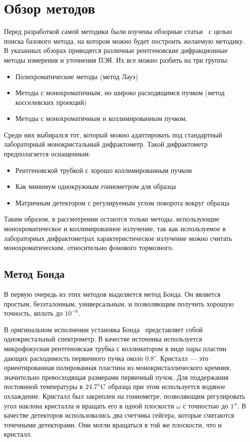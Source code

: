 \section{Обзор методов}

Перед разработкой самой методики были изучены обзорные статьи~\cite{Lider:2020,Galdecka:2006} с целью поиска базового метода, на котором можно будет построить желаемую методику.
В указанных обзорах приводятся различные рентгеновские дифракционные методы измерения и уточнения ПЭЯ.
Их все можно разбить на три группы:
\begin{itemize}
    \item Полихроматические методы (метод Лауэ)
    \item Методы с монохроматичным, но широко расходящимся пучком (метод косселевских проекций)
    \item Методы с монохроматичным и коллимированным пучком.
\end{itemize}
Среди них выбирался тот, который можно адаптировать под стандартный лабораторный монокристальный дифрактометр.
Такой дифрактометр предполагается оснащенным:
\begin{itemize}
    \item Рентгеновской трубкой с хорошо коллимированным пучком
    \item Как минимум однокружным гониометром для образца
    \item Матричным детектором с регулируемым углом поворота вокруг образца
\end{itemize}
Таким образом, в рассмотрении остаются только методы, использующие монохроматическое и коллимированное излучение, так как используемое в лабораторных дифрактометрах характеристическое излучение можно считать монохроматическим, относительно фонового тормозного.

\subsection{Метод Бонда}

В первую очередь из этих методов выделяется метод Бонда.
Он является простым, безэталонным, универсальным, и позволяющим получить хорошую точность, вплоть до $10^{-6}$.

В оригинальном исполнении установка Бонда~\cite{Bond:1960} представляет собой однокристальный спектрометр.
В качестве источника используется микрофокусная рентгеновская трубка с коллиматором в виде пары пластин дающих расходимость первичного пучка около $0.8'$.
Кристалл --- это ориентированная полированная пластина из монокристаллического кремния, значительно превосходящая размерами первичный пучок.
Для поддержания постоянной температуры в $24.7^\circ \text{C}$ образца при этом используется водяное охлаждение.
Кристалл был закреплен на гониометре, позволяющим регулировать угол наклона кристалла и вращать его в одной плоскости $\omega$ с точностью до $1''$.
В качестве детекторов использовались два счетчика гейгера, которые считаются точечными детекторами.
Они могли вращаться в той же плоскости, что и кристалл.

